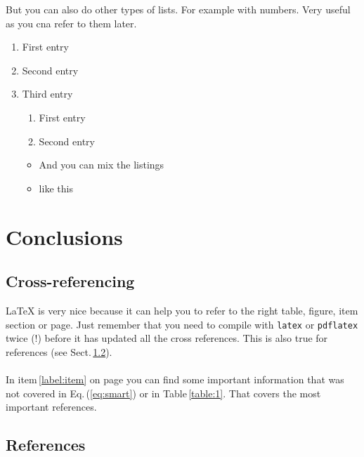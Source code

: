 \documentclass[12pt]{report}
\begin{document}
But you can also do other types of lists. For example with numbers. Very useful
as you cna refer to them later.

\begin{enumerate}
  \item First entry
  \item Second entry
  \item Third entry
    \begin{enumerate} 
  \item First entry \label{label:item}
  \item Second entry
  \end{enumerate}
      \begin{itemize}
          \item And you can mix the listings
          \item like this 
      \end{itemize}
\end{enumerate}     

\chapter{Conclusions}

\section{Cross-referencing}

LaTeX is very nice because it can help you to refer to the right table, figure,
item section or page. Just remember that you need to compile with {\tt latex}
or {\tt pdflatex} twice (!) before it has updated all the cross references.
This is also true for references (see Sect.\,\ref{sect:refs}).
\\ \\
In item\,\ref{label:item} on page \pageref{label:item} you can find some
important information that was not covered in Eq.\,(\ref{eq:smart}) or in
Table\,\ref{table:1}. That covers the most important references.

\section{References}
\label{sect:refs}
\end{document}
